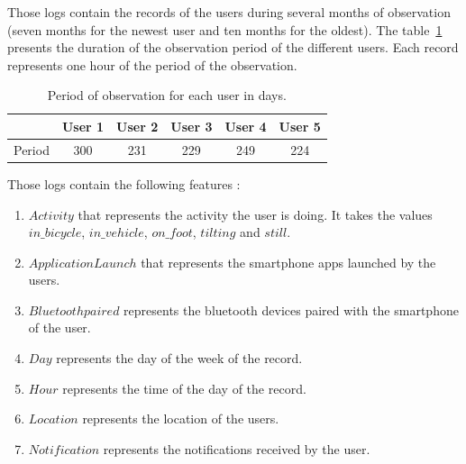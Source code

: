 \noindent
Those logs contain the records of the users during several months of observation (seven months for the newest user and ten months for the oldest). The table~\ref{duration} presents the duration of the observation period of the different users. Each record represents one hour of the period of the observation.

\begin{table}[H] 
\centering
\label{duration}
\begin{tabular}{|l|c|c|c|c|c|}
  \hline
  &User 1 & User 2 & User 3 & User 4 & User 5 \\
 \hline
  Period & 300 & 231 & 229 & 249 &  224 \\
 \hline
\end{tabular}
\caption {Period of observation for each user in days.} 
\end{table}

Those logs contain the following features :

\begin{enumerate}
\item $Activity$ that represents the activity the user is doing. It takes the values $in\_bicycle$, $in\_vehicle$, $on\_foot$, $tilting$ and $still$.
\item $Application Launch$ that represents the smartphone apps launched by the users.
\item $Bluetooth paired$ represents the bluetooth devices paired with the smartphone of the user.
\item $Day$ represents the day of the week of the record.
\item $Hour$ represents the time of the day of the record.
\item $Location$ represents the location of the users.
\item $Notification$ represents the notifications received by the user.
\end{enumerate}

